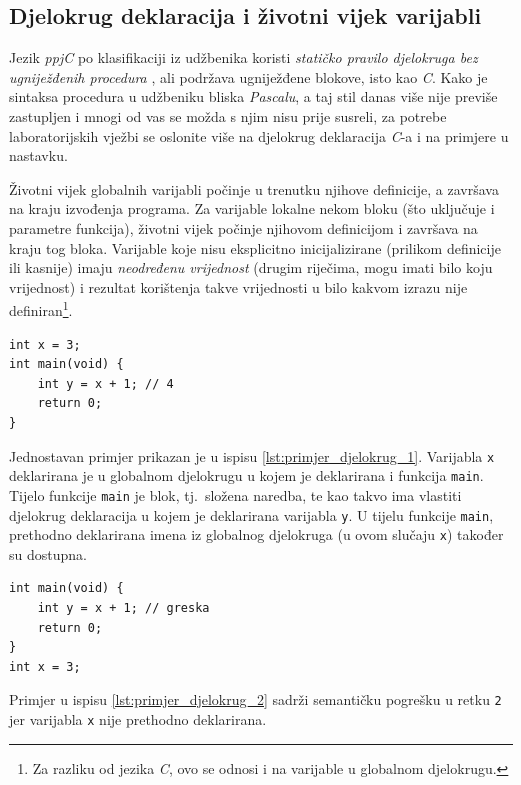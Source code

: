 \documentclass[times, 12pt, utf8]{book}
\begin{document}
\subsection{Djelokrug deklaracija i životni vijek varijabli}
Jezik \emph{ppjC} po klasifikaciji iz udžbenika koristi \emph{statičko pravilo djelokruga bez ugniježđenih procedura} \cite[str.~223--224]{udzbenik}, ali podržava ugniježđene blokove, isto kao \emph{C}.
Kako je sintaksa procedura u udžbeniku bliska \emph{Pascalu}, a taj stil danas više nije previše zastupljen i mnogi od vas se možda s njim nisu prije susreli, za potrebe laboratorijskih vježbi se oslonite više na djelokrug deklaracija \emph{C}-a i na primjere u nastavku.

Životni vijek globalnih varijabli počinje u trenutku njihove definicije, a završava na kraju izvođenja programa.
Za varijable lokalne nekom bloku (što uključuje i parametre funkcija), životni vijek počinje njihovom definicijom i završava na kraju tog bloka.
Varijable koje nisu eksplicitno inicijalizirane (prilikom definicije ili kasnije) imaju \emph{neodređenu vrijednost} (drugim riječima, mogu imati bilo koju vrijednost) i rezultat korištenja takve vrijednosti u bilo kakvom izrazu nije definiran\footnote{Za razliku od jezika \emph{C}, ovo se odnosi i na varijable u globalnom djelokrugu.}.

\begin{lstlisting}[caption={Jednostavan primjer djelokruga deklaracija.},label=lst:primjer_djelokrug_1]
int x = 3;
int main(void) {
    int y = x + 1; // 4
    return 0;
}
\end{lstlisting}

Jednostavan primjer prikazan je u ispisu \ref{lst:primjer_djelokrug_1}.
Varijabla \verb|x| deklarirana je u globalnom djelokrugu u kojem je deklarirana i funkcija \verb|main|.
Tijelo funkcije \verb|main| je blok, tj.~složena naredba, te kao takvo ima vlastiti djelokrug deklaracija u kojem je deklarirana varijabla \verb|y|.
U tijelu funkcije \verb|main|, prethodno deklarirana imena iz globalnog djelokruga (u ovom slučaju \verb|x|) također su dostupna.

\begin{lstlisting}[caption={Primjer pogreške u djelokrugu --- varijabla \texttt{x} nije deklarirana prije korištenja.},label=lst:primjer_djelokrug_2]
int main(void) {
    int y = x + 1; // greska
    return 0;
}
int x = 3;
\end{lstlisting}

Primjer u ispisu \ref{lst:primjer_djelokrug_2} sadrži semantičku pogrešku u retku \verb|2| jer varijabla \verb|x| nije prethodno deklarirana.
\end{document}
